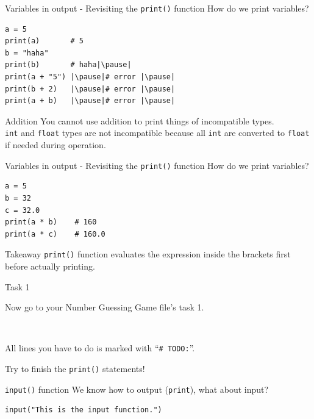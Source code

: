 \documentclass[dvipsnames, svgnames, x11names]{beamer}
\begin{document}
\begin{frame}[fragile]{Variables in output - Revisiting the \texttt{print()} function}
How do we print variables?

\begin{verbatim}
a = 5
print(a)       # 5
b = "haha"
print(b)       # haha|\pause|
print(a + "5") |\pause|# error |\pause|
print(b + 2)   |\pause|# error |\pause|
print(a + b)   |\pause|# error |\pause|
\end{verbatim}
\begin{block}{Addition}
You cannot use addition to print things of incompatible types.\\
\texttt{int} and \texttt{float} types are not incompatible because all \texttt{int} are converted to \texttt{float} if needed during operation.
\end{block}
\end{frame}

\begin{frame}[fragile]{Variables in output - Revisiting the \texttt{print()} function}
How do we print variables?

\begin{verbatim}
a = 5
b = 32
c = 32.0
print(a * b)    # 160
print(a * c)    # 160.0
\end{verbatim}
\pause
\begin{block}{Takeaway}
\texttt{print()} function evaluates the expression inside the brackets first before actually printing.
\end{block}
\end{frame}

\begin{frame}[fragile]{Task 1}
    \begin{center}
        Now go to your Number Guessing Game file's task 1.

        \
            
        All lines you have to do is marked with ``\texttt{\# TODO:}''.

        Try to finish the \texttt{print()} statements!
    \end{center}
\end{frame}

\begin{frame}[fragile]{\texttt{input()} function}
We know how to output (\texttt{print}), what about input?
\begin{verbatim} 
input("This is the input function.")
\end{verbatim}
\end{frame}
\end{document}
